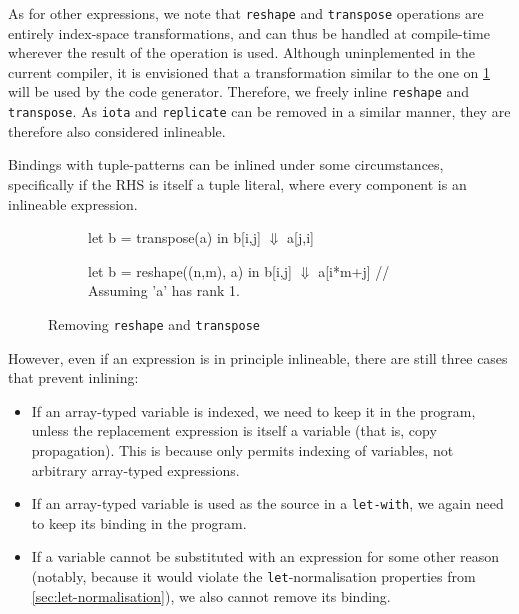 As for other expressions, we note that \texttt{reshape} and
\texttt{transpose} operations are entirely index-space
transformations, and can thus be handled at compile-time wherever the
result of the operation is used.  Although uninplemented in the
current \LO{} compiler, it is envisioned that a transformation similar
to the one on \cref{fig:removing-reshape-transpose} will be used by
the code generator.  Therefore, we freely inline \texttt{reshape} and
\texttt{transpose}.  As \texttt{iota} and \texttt{replicate} can be
removed in a similar manner, they are therefore also considered
inlineable.

Bindings with tuple-patterns can be inlined under some circumstances,
specifically if the RHS is itself a tuple literal, where every
component is an inlineable expression.

\begin{figure}
\centering
\begin{subfigure}[t]{.4\textwidth}
\centering
\begin{colorcode}
let b = transpose(a) in
b[i,j]
  \(\Downarrow\)
a[j,i]
\end{colorcode}
\end{subfigure}%
\begin{subfigure}[t]{.5\textwidth}
\centering
\begin{colorcode}
let b = reshape((n,m), a) in
b[i,j]
  \(\Downarrow\)
a[i*m+j] // Assuming 'a' has rank 1.
\end{colorcode}
\end{subfigure}%
\caption{Removing \texttt{reshape} and \texttt{transpose}}
\label{fig:removing-reshape-transpose}
\end{figure}

However, even if an expression is in principle inlineable, there are
still three cases that prevent inlining:

\begin{itemize}
\item If an array-typed variable is indexed, we need to keep it in the
  program, unless the replacement expression is itself a variable
  (that is, copy propagation).  This is because \LO{} only permits
  indexing of variables, not arbitrary array-typed expressions.

\item If an array-typed variable is used as the source in a
  \texttt{let-with}, we again need to keep its binding in the program.

\item If a variable cannot be substituted with an expression for some
  other reason (notably, because it would violate the
  \texttt{let}-normalisation properties from
  \cref{sec:let-normalisation}), we also cannot remove its binding.
\end{itemize}

